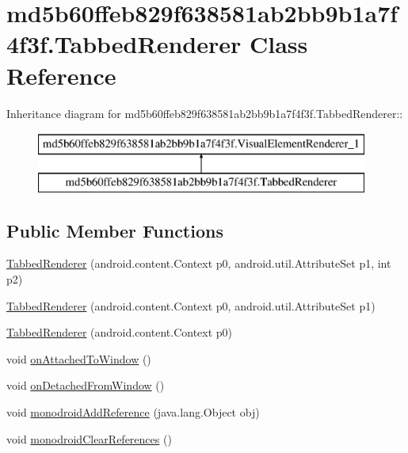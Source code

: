 \hypertarget{classmd5b60ffeb829f638581ab2bb9b1a7f4f3f_1_1_tabbed_renderer}{
\section{md5b60ffeb829f638581ab2bb9b1a7f4f3f.TabbedRenderer Class Reference}
\label{classmd5b60ffeb829f638581ab2bb9b1a7f4f3f_1_1_tabbed_renderer}
}
Inheritance diagram for md5b60ffeb829f638581ab2bb9b1a7f4f3f.TabbedRenderer::\begin{figure}[H]
\begin{center}
\leavevmode
\includegraphics[height=2cm]{classmd5b60ffeb829f638581ab2bb9b1a7f4f3f_1_1_tabbed_renderer}
\end{center}
\end{figure}
\subsection*{Public Member Functions}
\begin{CompactItemize}
\item 
\hyperlink{classmd5b60ffeb829f638581ab2bb9b1a7f4f3f_1_1_tabbed_renderer_58094d971cda65d13a4494b4c01d6606}{TabbedRenderer} (android.content.Context p0, android.util.AttributeSet p1, int p2)
\item 
\hyperlink{classmd5b60ffeb829f638581ab2bb9b1a7f4f3f_1_1_tabbed_renderer_3b8fd0e5dc0df3553dda11d43292045a}{TabbedRenderer} (android.content.Context p0, android.util.AttributeSet p1)
\item 
\hyperlink{classmd5b60ffeb829f638581ab2bb9b1a7f4f3f_1_1_tabbed_renderer_1e7ca4d75fddda52cec47dee49875855}{TabbedRenderer} (android.content.Context p0)
\item 
void \hyperlink{classmd5b60ffeb829f638581ab2bb9b1a7f4f3f_1_1_tabbed_renderer_1e20c6fb1a9e43d31e453be14845d61b}{onAttachedToWindow} ()
\item 
void \hyperlink{classmd5b60ffeb829f638581ab2bb9b1a7f4f3f_1_1_tabbed_renderer_5ff59fab206273b68a92840b279acd12}{onDetachedFromWindow} ()
\item 
void \hyperlink{classmd5b60ffeb829f638581ab2bb9b1a7f4f3f_1_1_tabbed_renderer_1ac0d0bc3f7d31327bd95fbf0ddf533c}{monodroidAddReference} (java.lang.Object obj)
\item 
void \hyperlink{classmd5b60ffeb829f638581ab2bb9b1a7f4f3f_1_1_tabbed_renderer_798c70a93fbc1b979f670015b6d12ed9}{monodroidClearReferences} ()
\end{CompactItemize}
